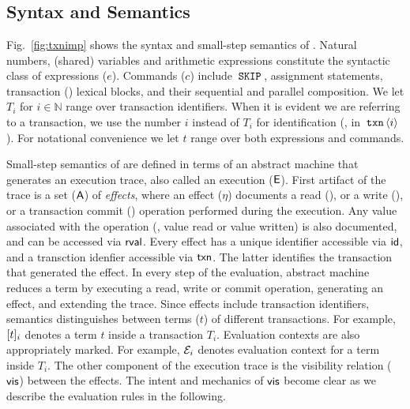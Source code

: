 \section{\txnimp}
\label{sec:opsem}



\subsection{Syntax and Semantics}
\label{sec:syntax}

Fig.~\ref{fig:txnimp} shows the syntax and small-step semantics of
\txnimp. Natural numbers, (shared) variables and arithmetic
expressions constitute the syntactic class of expressions ($e$).
Commands ($c$) include $\,{\tt SKIP}\,$, assignment statements, transaction
() lexical blocks, and their sequential and parallel
composition. We let $T_i$ for $i \in \mathbb{N}$ range over
transaction identifiers. When it is evident we are referring to a
transaction, we use the number $i$ instead of $T_i$ for identification
(\eg, in $\,{\tt txn}\,\langle i \rangle$). For notational convenience we let
$t$ range over both expressions and commands.

Small-step semantics of \txnimp are defined in terms of an abstract
machine that generates an execution trace, also called an execution
($\textsf{E}$). First artifact of the trace is a set ($\textsf{A}$) of \emph{effects},
where an effect ($\eta$) documents a read (), or a write
(), or a transaction commit () operation performed
during the execution. Any value associated with the operation (\eg,
value read or value written) is also documented, and can be accessed
via $\textsf{rval}$. Every effect has a unique identifier accessible via
$\textsf{id}$, and a transction idenfier accessible via $\textsf{txn}$.  The latter
identifies the transaction that generated the effect. In every step of
the evaluation, abstract machine reduces a \txnimp term by executing a
read, write or commit operation, generating an effect, and extending
the trace. Since effects include transaction identifiers, semantics
distinguishes between terms ($t$) of different transactions. For
example, $\lbrack t \rbrack_i$ denotes a term $t$ inside a transaction $T_i$.
Evaluation contexts are also appropriately marked. For example,
$\mathcal{E}_i$ denotes evaluation context for a term inside $T_i$. The
other component of the execution trace is the visibility relation
($\textsf{vis}$) between the effects. The intent and mechanics of $\textsf{vis}$
become clear as we describe the evaluation rules in the following.

